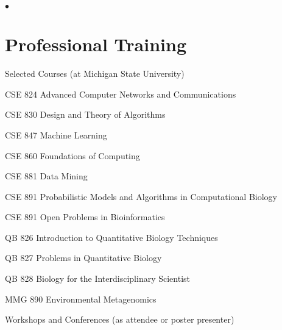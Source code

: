\documentclass[margin,line]{res}
\newenvironment{list1}{
  \begin{list}{\ding{113}}{%
      \setlength{\itemsep}{0in}
      \setlength{\parsep}{0in} \setlength{\parskip}{0in}
      \setlength{\topsep}{0in} \setlength{\partopsep}{0in} 
      \setlength{\leftmargin}{0.17in}}}{\end{list}}
\newenvironment{list2}{
  \begin{list}{$\bullet$}{%
      \setlength{\itemsep}{0in}
      \setlength{\parsep}{0in} \setlength{\parskip}{0in}
      \setlength{\topsep}{0in} \setlength{\partopsep}{0in} 
      \setlength{\leftmargin}{0.2in}}}{\end{list}}
\begin{document}
\begin{resume}
\begin{list2}
\end{list2}

\section{\sc Professional Training}

\begin{list1}

\item[] Selected Courses (at Michigan State University)

\begin{list1}
\vspace*{.05in}
\item[]  CSE 824 Advanced Computer Networks and Communications
\item[]  CSE 830 Design and Theory of Algorithms
\item[]  CSE 847 Machine Learning
\item[]  CSE 860 Foundations of Computing
\item[]  CSE 881 Data Mining
\item[]  CSE 891 Probabilistic Models and Algorithms in Computational Biology
\item[]  CSE 891 Open Problems in Bioinformatics
\item[]  QB 826 Introduction to Quantitative Biology Techniques
\item[]  QB 827 Problems in Quantitative Biology
\item[]  QB 828 Biology for the Interdisciplinary Scientist
\item[]  MMG 890 Environmental Metagenomics

\end{list1}
\vspace*{.1in}

\item[] Workshops and Conferences (as attendee or poster presenter)


\end{list1}
\end{resume}
\end{document}
